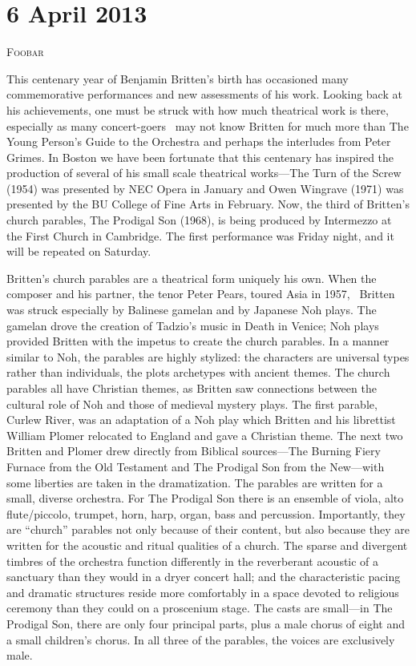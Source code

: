 \chapter{6 April 2013}

\textsc{Foobar}

This centenary year of Benjamin Britten’s birth has occasioned many commemorative performances and new assessments of his work. Looking back at his achievements, one must be struck with how much theatrical work is there, especially as many concert-goers  may not know Britten for much more than The Young Person’s Guide to the Orchestra and perhaps the interludes from Peter Grimes. In Boston we have been fortunate that this centenary has inspired the production of several of his small scale theatrical works—The Turn of the Screw (1954) was presented by NEC Opera in January and Owen Wingrave (1971) was presented by the BU College of Fine Arts in February. Now, the third of Britten’s church parables, The Prodigal Son (1968), is being produced by Intermezzo at the First Church in Cambridge. The first performance was Friday night, and it will be repeated on Saturday.

Britten's church parables are a theatrical form uniquely his own. When the composer and his partner, the tenor Peter Pears, toured Asia in 1957,  Britten was struck especially by Balinese gamelan and by Japanese Noh plays. The gamelan drove the creation of Tadzio’s music in Death in Venice; Noh plays provided Britten with the impetus to create the church parables. In a manner similar to Noh, the parables are highly stylized: the characters are universal types rather than individuals, the plots archetypes with ancient themes. The church parables all have Christian themes, as Britten saw connections between the cultural role of Noh and those of medieval mystery plays. The first parable, Curlew River, was an adaptation of a Noh play which Britten and his librettist William Plomer relocated to England and gave a Christian theme. The next two Britten and Plomer drew directly from Biblical sources—The Burning Fiery Furnace from the Old Testament and The Prodigal Son from the New—with some liberties are taken in the dramatization. The parables are written for a small, diverse orchestra. For The Prodigal Son there is an ensemble of viola, alto flute/piccolo, trumpet, horn, harp, organ, bass and percussion. Importantly, they are “church” parables not only because of their content, but also because they are written for the acoustic and ritual qualities of a church. The sparse and divergent timbres of the orchestra function differently in the reverberant acoustic of a sanctuary than they would in a dryer concert hall; and the characteristic pacing and dramatic structures reside more comfortably in a space devoted to religious ceremony than they could on a proscenium stage. The casts are small—in The Prodigal Son, there are only four principal parts, plus a male chorus of eight and a small children’s chorus. In all three of the parables, the voices are exclusively male.

